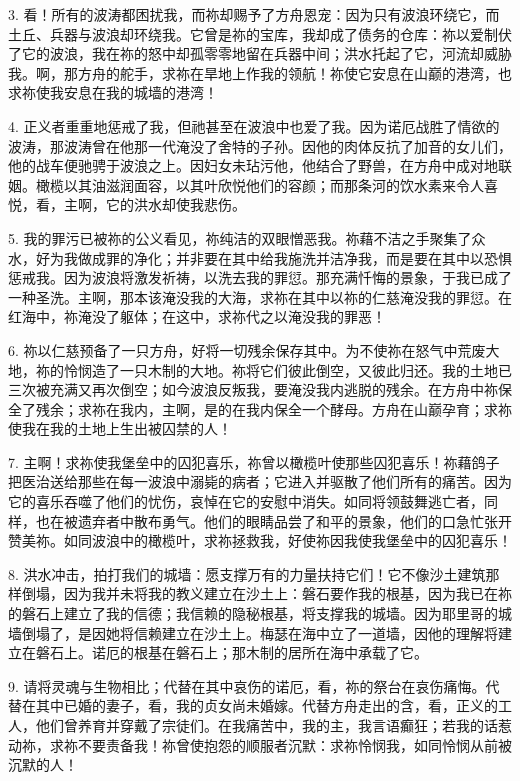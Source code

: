 3. 看！所有的波涛都困扰我，而祢却赐予了方舟恩宠：因为只有波浪环绕它，而土丘、兵器与波浪却环绕我。它曾是祢的宝库，我却成了债务的仓库：祢以爱制伏了它的波浪，我在祢的怒中却孤零零地留在兵器中间；洪水托起了它，河流却威胁我。啊，那方舟的舵手，求祢在旱地上作我的领航！祢使它安息在山巅的港湾，也求祢使我安息在我的城墙的港湾！\par

4. 正义者重重地惩戒了我，但祂甚至在波浪中也爱了我。因为诺厄战胜了情欲的波涛，那波涛曾在他那一代淹没了舍特的子孙。因他的肉体反抗了加音的女儿们，他的战车便驰骋于波浪之上。因妇女未玷污他，他结合了野兽，在方舟中成对地联姻。橄榄以其油滋润面容，以其叶欣悦他们的容颜；而那条河的饮水素来令人喜悦，看，主啊，它的洪水却使我悲伤。\par

5. 我的罪污已被祢的公义看见，祢纯洁的双眼憎恶我。祢藉不洁之手聚集了众水，好为我做成罪的净化；并非要在其中给我施洗并洁净我，而是要在其中以恐惧惩戒我。因为波浪将激发祈祷，以洗去我的罪愆。那充满忏悔的景象，于我已成了一种圣洗。主啊，那本该淹没我的大海，求祢在其中以祢的仁慈淹没我的罪愆。在红海中，祢淹没了躯体；在这中，求祢代之以淹没我的罪恶！\par

6. 祢以仁慈预备了一只方舟，好将一切残余保存其中。为不使祢在怒气中荒废大地，祢的怜悯造了一只木制的大地。祢将它们彼此倒空，又彼此归还。我的土地已三次被充满又再次倒空；如今波浪反叛我，要淹没我内逃脱的残余。在方舟中祢保全了残余；求祢在我内，主啊，是的在我内保全一个酵母。方舟在山巅孕育；求祢使我在我的土地上生出被囚禁的人！\par

7. 主啊！求祢使我堡垒中的囚犯喜乐，祢曾以橄榄叶使那些囚犯喜乐！祢藉鸽子把医治送给那些在每一波浪中溺毙的病者；它进入并驱散了他们所有的痛苦。因为它的喜乐吞噬了他们的忧伤，哀悼在它的安慰中消失。如同将领鼓舞逃亡者，同样，也在被遗弃者中散布勇气。他们的眼睛品尝了和平的景象，他们的口急忙张开赞美祢。如同波浪中的橄榄叶，求祢拯救我，好使祢因我使我堡垒中的囚犯喜乐！\par

8. 洪水冲击，拍打我们的城墙：愿支撑万有的力量扶持它们！它不像沙土建筑那样倒塌，因为我并未将我的教义建立在沙土上：磐石要作我的根基，因为我已在祢的磐石上建立了我的信德；我信赖的隐秘根基，将支撑我的城墙。因为耶里哥的城墙倒塌了，是因她将信赖建立在沙土上。梅瑟在海中立了一道墙，因他的理解将建立在磐石上。诺厄的根基在磐石上；那木制的居所在海中承载了它。\par

9. 请将灵魂与生物相比；代替在其中哀伤的诺厄，看，祢的祭台在哀伤痛悔。代替在其中已婚的妻子，看，我的贞女尚未婚嫁。代替方舟走出的含，看，正义的工人，他们曾养育并穿戴了宗徒们。在我痛苦中，我的主，我言语癫狂；若我的话惹动祢，求祢不要责备我！祢曾使抱怨的顺服者沉默：求祢怜悯我，如同怜悯从前被沉默的人！\par

